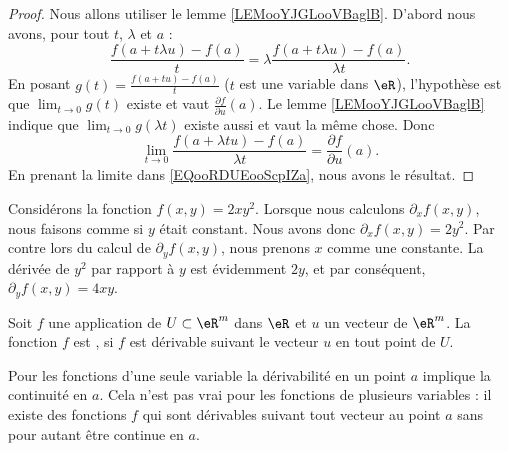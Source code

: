 \begin{proof}
	Nous allons utiliser le lemme \ref{LEMooYJGLooVBaglB}. D'abord nous avons, pour tout \( t\), \( \lambda\) et \( a\)  :
	\begin{equation}        \label{EQooRDUEooScpIZa}
		\frac{ f(a+t\lambda u)-f(a) }{ t }=\lambda\frac{ f(a+t\lambda u)-f(a) }{ \lambda t }.
	\end{equation}
	En posant \( g(t)=\frac{ f(a+tu)-f(a) }{ t }\) (\( t\) est une variable dans \( \eR\)), l'hypothèse est que \( \lim_{t\to 0} g(t)\) existe et vaut \( \frac{ \partial f }{ \partial u }(a)\). Le lemme \ref{LEMooYJGLooVBaglB} indique que \( \lim_{t\to 0} g(\lambda t)\) existe aussi et vaut la même chose. Donc
	\begin{equation}
		\lim_{t\to 0} \frac{ f(a+\lambda tu)-f(a) }{ \lambda t }=\frac{ \partial f }{ \partial u }(a).
	\end{equation}
	En prenant la limite dans \eqref{EQooRDUEooScpIZa}, nous avons le résultat.
\end{proof}

\begin{example}
	Considérons la fonction \( f(x,y)=2xy^2\). Lorsque nous calculons \( \partial_xf(x,y)\), nous faisons comme si \( y\) était constant. Nous avons donc \( \partial_xf(x,y)=2y^2\). Par contre lors du calcul de \( \partial_yf(x,y)\), nous prenons \( x\) comme une constante. La dérivée de \( y^2\) par rapport à \( y\) est évidemment \( 2y\), et par conséquent, \( \partial_yf(x,y)=4xy\).
\end{example}

\begin{definition}
	Soit \( f\) une application de \( U\subset\eR^m\) dans \( \eR\) et \( u\) un vecteur de \( \eR^m\). La fonction \( f\) est , si \( f\) est dérivable  suivant le vecteur \( u\) en tout point de \( U\).
\end{definition}

Pour les fonctions d'une seule variable la dérivabilité en un point \( a\) implique la continuité en \( a\). Cela n'est pas vrai pour les fonctions de plusieurs variables : il existe des fonctions \( f\)  qui sont dérivables suivant tout vecteur au point \( a\) sans pour autant être continue en \( a\).

